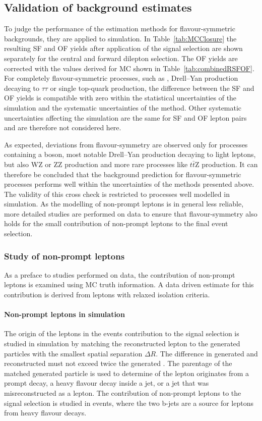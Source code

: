 \subsection{Validation of background estimates}
\label{sec:validation}
To judge the performance of the estimation methods for flavour-symmetric backgrounds, they are applied to simulation. In Table~\ref{tab:MCClosure} the resulting SF and OF yields after application of the signal selection are shown separately for the central and forward dilepton selection. The OF yields are corrected with the \Rsfof values derived for MC shown in Table~\ref{tab:combinedRSFOF}. For completely flavour-symmetric processes, such as \ttbar, Drell--Yan production decaying to $\tau\tau$ or single top-quark production, the difference between the SF and OF yields is compatible with zero within the statistical uncertainties of the simulation and the systematic uncertainties of the method. Other systematic uncertainties affecting the simulation are the same for SF and OF lepton pairs and are therefore not considered here. 

 As expected, deviations from flavour-symmetry are observed only for processes containing a \Z boson, most notable Drell--Yan production decaying to light leptons, but also WZ or ZZ production and more rare processes like $t\bar{t}$Z production. It can therefore be concluded that the background prediction for flavour-symmetric processes performs well within the uncertainties of the methods presented above. The validity of this cross check is restricted to processes well modelled in simulation. As the modelling of non-prompt leptons is in general less reliable, more detailed studies are performed on data to ensure that flavour-symmetry also holds for the small contribution of non-prompt leptons to the final event selection.
\subsubsection*{Study of non-prompt leptons}
As a preface to studies performed on data, the contribution of non-prompt leptons is examined using MC truth information. A data driven estimate for this contribution is derived from leptons with relaxed isolation criteria.
\paragraph*{Non-prompt leptons in simulation}
The origin of the leptons in the events contribution to the signal selection is studied in simulation by matching the reconstructed lepton to the generated particles with the smallest spatial separation $\Delta R$. The difference in generated and reconstructed \pt must not exceed twice the generated \pt. The parentage of the matched generated particle is used to determine of the lepton originates from a prompt decay, a heavy flavour decay inside a jet, or a jet that was misreconstructed as a lepton. The contribution of non-prompt leptons to the signal selection is studied in \ttbar events, where the two b-jets are a source for leptons from heavy flavour decays. 

